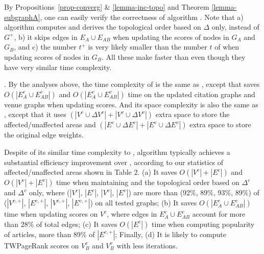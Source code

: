 
By Propositions~\ref{prop-converg} \& \ref{lemma-inc-topo} and Theorem \ref{lemma-subgraphA}, one can easily verify the correctness of algorithm \inctwprscc.
%
Note that  a) algorithm \inctwprscc computes \sccs and derives the topological order based  on $\Delta$ only, instead of $G^{+}$,
b) it skips edges in $E_A\cup E_{AB}$ when updating the scores of nodes in $G_A$ and $G_B$, and
c) the number $t^+$ is very likely smaller than the number $t$ of \twprscc when updating scores of nodes in $G_B$.
%
All these make \inctwprscc faster than \twprscc even though they have very similar time complexity.






.
By the analyses above, the time complexity of \incensemble is the same as \batensemble, except that \incensemble saves $O(|E^c_A\cup E^c_{AB}|)$ and $O(|E^v_A\cup E^v_{AB}|)$ time on the updated citation graphs and venue graphs when updating scores. And its space complexity is also the same as \batensemble, except that it uses $(|V^c\cup\Delta V^c|+|V^v\cup\Delta V^v|)$ extra space to store the affected/unaffected areas and $(|E^c\cup \Delta E^c|+|E^v\cup \Delta E^v|)$ extra space to store the original edge weights.

Despite of its similar time complexity to \batensemble, algorithm \incensemble typically achieves a substantial efficiency improvement over \batensemble, according to our statistics of affected/unaffected areas shown in Table 2.
%
(a) It saves $O(|V^c|+|E^c|)$ and $O(|V^v|+|E^v|)$ time when maintaining \sccs and the topological order based on $\Delta^c$ and $\Delta^v$ only, where ($|V^c|$, $|E^c|$, $|V^v|$, $|E^v|$) are more than (92\%, 89\%, 93\%, 89\%) of ($|V^{c,+}|$, $|E^{c,+}|$, $|V^{v,+}|$, $|E^{v,+}|$) on all tested graphs;
(b) It saves $O(|E^c_A \cup E^c_{AB}|)$ time when updating scores on $V^c$, where edges in $E^c_A\cup E^c_{AB}$ account for more than 28\% of total edges;
(c) It saves $O(|E^c|)$ time when computing popularity of articles, \ie more than 89\% of $|E^{c,+}|$;
Finally, (d) It is likely to compute TWPageRank scores on $V^c_B$ and $V^v_B$ with less iterations.




